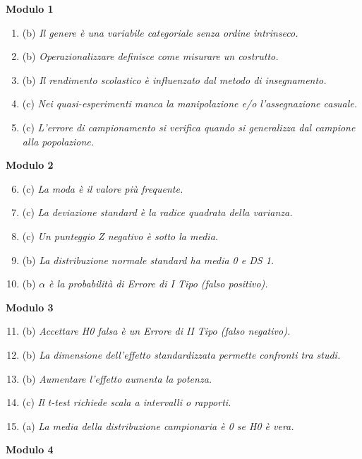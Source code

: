 \documentclass[12pt, a4paper]{article}
\begin{document}
\begin{footnotesize}
\begin{multicols}{3}
\textbf{Modulo 1}
\begin{enumerate}
    \item (b) \textit{Il genere è una variabile categoriale senza ordine intrinseco.}
    \item (b) \textit{Operazionalizzare definisce come misurare un costrutto.}
    \item (b) \textit{Il rendimento scolastico è influenzato dal metodo di insegnamento.}
    \item (c) \textit{Nei quasi-esperimenti manca la manipolazione e/o l'assegnazione casuale.}
    \item (c) \textit{L'errore di campionamento si verifica quando si generalizza dal campione alla popolazione.}
\end{enumerate}
\vspace{0.5cm}
\textbf{Modulo 2}
\begin{enumerate}
    \setcounter{enumi}{5}
    \item (c) \textit{La moda è il valore più frequente.}
    \item (c) \textit{La deviazione standard è la radice quadrata della varianza.}
    \item (c) \textit{Un punteggio Z negativo è sotto la media.}
    \item (b) \textit{La distribuzione normale standard ha media 0 e DS 1.}
    \item (b) \textit{$\alpha$ è la probabilità di Errore di I Tipo (falso positivo).}
\end{enumerate}
\vspace{0.5cm}
\textbf{Modulo 3}
\begin{enumerate}
    \setcounter{enumi}{10}
    \item (b) \textit{Accettare H0 falsa è un Errore di II Tipo (falso negativo).}
    \item (b) \textit{La dimensione dell'effetto standardizzata permette confronti tra studi.}
    \item (b) \textit{Aumentare l'effetto aumenta la potenza.}
    \item (c) \textit{Il t-test richiede scala a intervalli o rapporti.}
    \item (a) \textit{La media della distribuzione campionaria è 0 se H0 è vera.}
\end{enumerate}
\columnbreak
\textbf{Modulo 4}
\begin{enumerate}

\end{enumerate}
\end{multicols}
\end{footnotesize}
\end{document}
